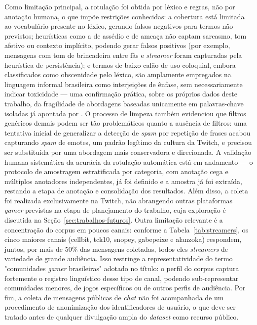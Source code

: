 \documentclass{eic-bcc-tcc}
\begin{document}
Como limitação principal, a rotulação foi obtida por léxico e regras, não por anotação humana, o que impõe restrições conhecidas: a cobertura está limitada ao vocabulário presente no léxico, gerando falsos negativos para termos não previstos; heurísticas como a de assédio e de ameaça não captam sarcasmo, tom afetivo ou contexto implícito, podendo gerar falsos positivos (por exemplo, mensagens com tom de brincadeira entre fãs e \textit{streamer} foram capturadas pela heurística de persistência); e termos de baixo calão de uso coloquial, embora classificados como obscenidade pelo léxico, são amplamente empregados na linguagem informal brasileira como interjeições de ênfase, sem necessariamente indicar toxicidade — uma confirmação prática, sobre os próprios dados deste trabalho, da fragilidade de abordagens baseadas unicamente em palavras-chave isoladas já apontada por \cite{melo2025torna}. O processo de limpeza também evidenciou que filtros genéricos demais podem ser tão problemáticos quanto a ausência de filtros: uma tentativa inicial de generalizar a detecção de \textit{spam} por repetição de frases acabou capturando \textit{spam} de emotes, um padrão legítimo da cultura da Twitch, e precisou ser substituída por uma abordagem mais conservadora e direcionada. A validação humana sistemática da acurácia da rotulação automática está em andamento — o protocolo de amostragem estratificada por categoria, com anotação cega e múltiplos anotadores independentes, já foi definido e a amostra já foi extraída, restando a etapa de anotação e consolidação dos resultados. Além disso, a coleta foi realizada exclusivamente na Twitch, não abrangendo outras plataformas \textit{gamer} previstas na etapa de planejamento do trabalho, cuja exploração é discutida na Seção~\ref{sec:trabalhos-futuros}. Outra limitação relevante é a concentração do corpus em poucos canais: conforme a Tabela~\ref{tab:streamers}, os cinco maiores canais (cellbit, tck10, snopey, gabepeixe e alanzoka) respondem, juntos, por mais de 50\% das mensagens coletadas, todos eles \textit{streamers} de variedade de grande audiência. Isso restringe a representatividade do termo "comunidades \textit{gamer} brasileiras" adotado no título: o perfil do corpus captura fortemente o registro linguístico desse tipo de canal, podendo sub-representar comunidades menores, de jogos específicos ou de outros perfis de audiência. Por fim, a coleta de mensagens públicas de \textit{chat} não foi acompanhada de um procedimento de anonimização dos identificadores de usuário, o que deve ser tratado antes de qualquer divulgação ampla do \textit{dataset} como recurso público.
\end{document}
